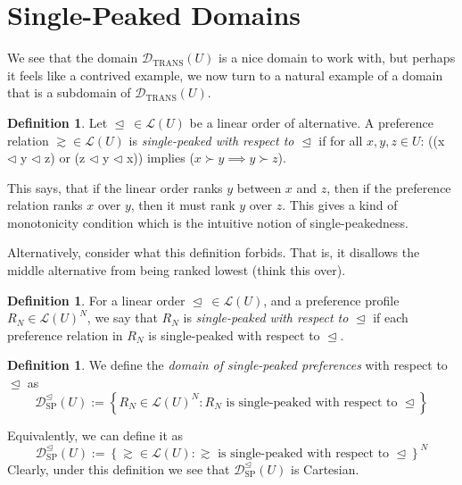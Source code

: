 \documentclass{book}
\theoremstyle{plain}
\theoremstyle{definition}
\newtheorem{definition}[theorem]{Definition}
\theoremstyle{remark}
\newcommand{\set}[1]{\left\{#1\right\}}
\begin{document}
\section{Single-Peaked Domains}


We see that the domain 
$\mathcal{D}_{\text{TRANS}}(U)$ is a nice domain to work with,
but perhaps it feels like a contrived example, 
we now turn to a natural example of a domain that is 
a subdomain of $\mathcal{D}_{\text{TRANS}}(U)$.

\begin{definition}
    Let $\trianglelefteq \ \in \mathcal{L}(U)$ be a linear order of alternative.
    A preference relation $\gtrsim \in \mathcal{L}(U)$ is \emph{single-peaked with respect to $\trianglelefteq$}
    if
    for all $x, y, z \in U$:
    ((x $\triangleleft$ y $\triangleleft$ z) or (z $\triangleleft$ y $\triangleleft$ x)) implies
    ($x \succ y \implies y \succ z$).

    This says, that if the linear order 
    ranks 
    $y$ between $x$ and $z$, 
    then if the preference relation ranks $x$ over $y$, then it must rank $y$ over $z$.
    This gives a kind of monotonicity condition which is the intuitive notion of single-peakedness.

    Alternatively, consider what this definition forbids.
    That is, it disallows the middle 
    alternative from being ranked lowest (think this over).
\end{definition}

\begin{definition}
    For a linear order $\trianglelefteq \ \in \mathcal{L}(U)$,
    and a preference profile 
    $R_N \in \mathcal{L}(U)^N$,
    we say that 
    $R_N$ is \emph{single-peaked with respect to $\trianglelefteq$}
    if each preference relation in $R_N$ is single-peaked with respect to $\trianglelefteq$.
\end{definition}


\begin{definition}
    We define the 
    \emph{domain of single-peaked preferences}
    with respect to $\trianglelefteq$ as
    \[    \mathcal{D}_{\text{SP}}^{\trianglelefteq}(U) := \set{R_N \in \mathcal{L}(U)^N : R_N \text{ is single-peaked with respect to } \trianglelefteq} \]

    
    Equivalently, 
    we can define
    it as
    \[
        \mathcal{D}_{\text{SP}}^{\trianglelefteq}(U) := \set{\gtrsim \in \mathcal{L}(U) : \gtrsim \text{ is single-peaked with respect to } \trianglelefteq}^N
    \]
    Clearly, under this definition we see that 
    $\mathcal{D}_{\text{SP}}^{\trianglelefteq}(U)$ is Cartesian.
\end{definition}
\end{document}
